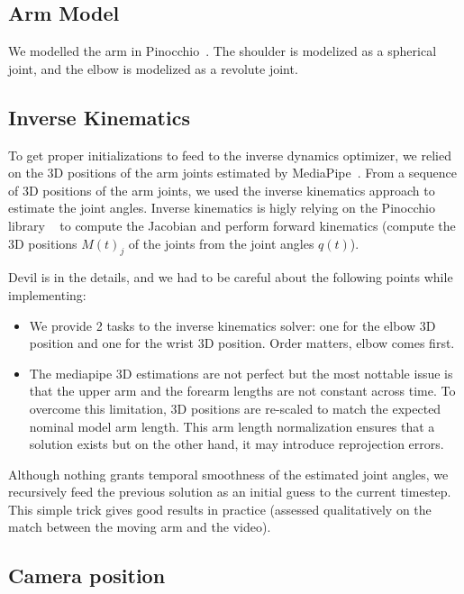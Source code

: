 \subsection{Arm Model}
\label{subsec:arm_model}
We modelled the arm in Pinocchio~\cite{carpentier2019pinocchio}. The shoulder is modelized as a spherical joint, and the elbow is modelized 
as a revolute joint.

\subsection{Inverse Kinematics}
\label{subsec:inverse_kinematics}
To get proper initializations to feed to the inverse dynamics optimizer, we relied on the 3D positions of the arm joints estimated by MediaPipe~\cite{lugaresi2019mediapipe}.
From a sequence of 3D positions of the arm joints, we used the inverse kinematics approach to estimate the joint angles.
Inverse kinematics is higly relying on the Pinocchio library ~\cite{carpentier2019pinocchio} to compute 
the Jacobian and perform forward kinematics (compute the 3D positions  $M(t)_{j}$ of the joints from the joint angles $q(t)$).

Devil is in the details, and we had to be careful about the following points while implementing:
\begin{itemize}
    \item We provide 2 tasks to the inverse kinematics solver: one for the elbow 3D position and one for the wrist 3D position. 
    Order matters, elbow comes first.
    \item The mediapipe 3D estimations are not perfect but the most nottable issue is that 
    the upper arm and the forearm lengths are not constant across time. To overcome this limitation,
    3D positions are re-scaled to match the expected nominal model arm length. 
    This arm length normalization ensures that a solution exists but on the other hand, it may introduce reprojection errors.
\end{itemize}
Although nothing grants temporal smoothness of the estimated joint angles, we recursively feed the previous solution as an initial guess to the current timestep.
This simple trick gives good results in practice (assessed qualitatively on the match between the moving arm and the video).


\subsection{Camera position}
\label{subsec:cam_estim}
